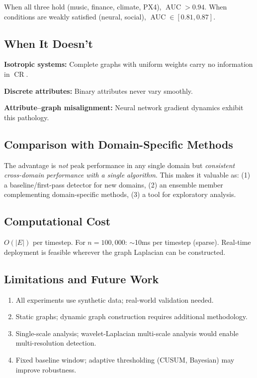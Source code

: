 \documentclass[11pt,a4paper]{article}
\DeclareMathOperator{\CR}{CR}
\DeclareMathOperator{\AUC}{AUC}
\begin{document}
When all three hold (music, finance, climate, PX4), $\AUC > 0.94$. When
conditions are weakly satisfied (neural, social), $\AUC \in [0.81, 0.87]$.

\subsection{When It Doesn't}

\textbf{Isotropic systems:} Complete graphs with uniform weights carry no
information in $\CR$.

\textbf{Discrete attributes:} Binary attributes never vary smoothly.

\textbf{Attribute--graph misalignment:} Neural network gradient dynamics exhibit
this pathology.

\subsection{Comparison with Domain-Specific Methods}

The advantage is \emph{not} peak performance in any single domain but
\emph{consistent cross-domain performance with a single algorithm}.  This makes
it valuable as: (1) a baseline/first-pass detector for new domains, (2) an
ensemble member complementing domain-specific methods, (3) a tool for
exploratory analysis.

\subsection{Computational Cost}

$O(|E|)$ per timestep.  For $n = 100{,}000$: $\sim$10ms per timestep (sparse).
Real-time deployment is feasible wherever the graph Laplacian can be constructed.

\subsection{Limitations and Future Work}

\begin{enumerate}
  \item All experiments use synthetic data; real-world validation needed.
  \item Static graphs; dynamic graph construction requires additional methodology.
  \item Single-scale analysis; wavelet-Laplacian multi-scale analysis would
        enable multi-resolution detection.
  \item Fixed baseline window; adaptive thresholding (CUSUM, Bayesian) may
        improve robustness.
\end{enumerate}
\end{document}
